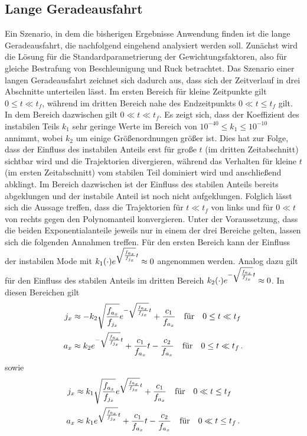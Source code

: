 \subsection{Lange Geradeausfahrt}
Ein Szenario, in dem die bisherigen Ergebnisse Anwendung finden ist die lange Geradeausfahrt, die nachfolgend eingehend analysiert werden soll. Zunächst wird die Lösung für die Standardparametrierung der Gewichtungsfaktoren, also für gleiche Bestrafung von Beschleunigung und Ruck betrachtet. Das Szenario einer langen Geradeausfahrt zeichnet sich dadurch aus, dass sich der Zeitverlauf in drei Abschnitte unterteilen lässt. Im ersten Bereich für kleine Zeitpunkte gilt $0\leq t\ll t_f$, während im dritten Bereich nahe des Endzeitpunkts $0\ll t\leq t_f$ gilt. In dem Bereich dazwischen gilt $0\ll t\ll t_f$. Es zeigt sich, dass der Koeffizient des instabilen Teils $k_1$ sehr geringe Werte im Bereich von $10^{-40}\leq k_1 \leq 10^{-10}$ annimmt, wobei $k_2$ um einige Größenordnungen größer ist. Dies hat zur Folge, dass der Einfluss des instabilen Anteils erst für große $t$ (im dritten Zeitabschnitt) sichtbar wird und die Trajektorien divergieren, während das Verhalten für kleine $t$ (im ersten Zeitabschnitt) vom stabilen Teil dominiert wird und anschließend abklingt. Im Bereich dazwischen ist der Einfluss des stabilen Anteils bereits abgeklungen und der instabile Anteil ist noch nicht aufgeklungen. Folglich lässt sich die Aussage treffen, dass die Trajektorien für $t\ll t_f$ von links und für $0\ll t$ von rechts gegen den Polynomanteil konvergieren. Unter der Voraussetzung, dass die beiden Exponentialanteile jeweils nur in einem der drei Bereiche gelten, lassen sich die folgenden Annahmen treffen. Für den ersten Bereich kann der Einfluss der instabilen Mode mit $k_1(\cdot)e^{\sqrt{\frac{f_{a_x}}{f_{j_x}}}t} \approx 0$ angenommen werden. Analog dazu gilt für den Einfluss des stabilen Anteils im dritten Bereich $k_2(\cdot)e^{-\sqrt{\frac{f_{a_x}}{f_{j_x}}}t} \approx 0$. In diesen Bereichen gilt 
\begin{align}
j_x &\approx -k_2\sqrt{\frac{f_{a_x}}{f_{j_x}}}e^{-\sqrt{\frac{f_{a_x}}{f_{j_x}}}t} + \frac{c_1}{f_{a_x}} \quad\textrm{für}\quad 0\leq t\ll t_f \label{eq:j_Bereich_1} \\
a_x &\approx k_2e^{-\sqrt{\frac{f_{a_x}}{f_{j_x}}}t} + \frac{c_1}{f_{a_x}}t - \frac{c_2}{f_{a_x}} \quad\textrm{für}\quad 0\leq t\ll t_f\,. \label{eq:a_Bereich_1}
\end{align}
sowie 
\begin{align}
j_x &\approx k_1\sqrt{\frac{f_{a_x}}{f_{j_x}}}e^{\sqrt{\frac{f_{a_x}}{f_{j_x}}}t} + \frac{c_1}{f_{a_x}} \quad\textrm{für}\quad 0\ll t\leq t_f \label{eq:j_Bereich_3} \\
a_x &\approx k_1e^{\sqrt{\frac{f_{a_x}}{f_{j_x}}}t} + \frac{c_1}{f_{a_x}}t - \frac{c_2}{f_{a_x}} \quad\textrm{für}\quad 0\ll t\leq t_f\,. \label{eq:a_Bereich_3}
\end{align}
